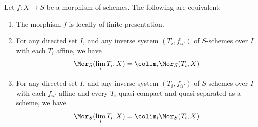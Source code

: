 \begin{proposition}
\label{proposition-characterize-locally-finite-presentation}
\begin{reference}
\cite[IV, Proposition 8.14.2]{EGA}
\end{reference}
Let $f : X \to S$ be a morphism of schemes.
The following are equivalent:
\begin{enumerate}
\item The morphism $f$ is locally of finite presentation.
\item For any directed set $I$, and any
inverse system $(T_i, f_{ii'})$ of $S$-schemes over $I$
with each $T_i$ affine, we have
$$
\Mor_S(\lim_i T_i, X) =
\colim_i \Mor_S(T_i, X)
$$
\item For any directed set $I$, and any
inverse system $(T_i, f_{ii'})$ of $S$-schemes over $I$
with each $f_{ii'}$ affine and every $T_i$ quasi-compact and
quasi-separated as a scheme, we have
$$
\Mor_S(\lim_i T_i, X) =
\colim_i \Mor_S(T_i, X)
$$
\end{enumerate}
\end{proposition}

